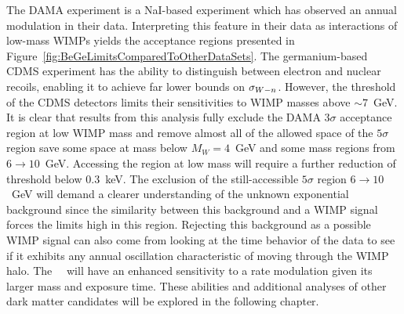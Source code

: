The DAMA experiment is a NaI-based experiment which has observed an annual modulation in their data.  Interpreting this feature in their data as interactions of low-mass WIMPs yields the acceptance regions presented in Figure~\ref{fig:BeGeLimitsComparedToOtherDataSets}.  The germanium-based CDMS experiment has the ability to distinguish between electron and nuclear recoils, enabling it to achieve far lower bounds on $\sigma_{W-n}$.  However, the threshold of the CDMS detectors limits their sensitivities to WIMP masses above $\sim7$~GeV.  It is clear that results from this analysis fully exclude the DAMA $3\sigma$ acceptance region at low WIMP mass and remove almost all of the allowed space of the $5\sigma$ region save some space at mass below $M_{W}=4$~GeV and some mass regions from $6\to10$~GeV.  Accessing the region at low mass will require a further reduction of threshold below 0.3~keV. %
The exclusion of the still-accessible $5\sigma$ region $6\to10$~GeV will demand a clearer understanding of the unknown exponential background since the similarity between this background and a WIMP signal forces the limits high in this region.  Rejecting this background as a possible WIMP signal can also come from looking at the time behavior of the data to see if it exhibits any annual oscillation characteristic of moving through the WIMP halo.  The \MJ~\minmod~will have an enhanced sensitivity to a rate modulation given its larger mass and exposure time.  These abilities and additional analyses of other dark matter candidates will be explored in the following chapter.







